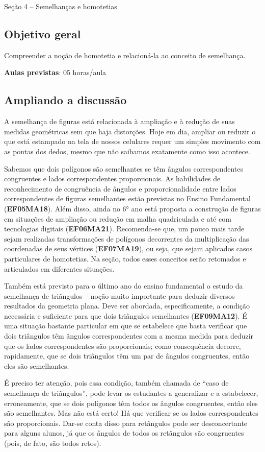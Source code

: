 \begin{paginatexto}{Seção 4 -- Semelhanças e homotetias}
\subsection{Objetivo geral}
Compreender a noção de homotetia e relacioná-la ao conceito de semelhança.

\textbf{Aulas previstas}: 05 horas/aula

\subsection{Ampliando a discussão}
A semelhança de figuras está relacionada à ampliação e à redução de suas medidas geométricas sem que haja distorções. Hoje em dia, ampliar ou reduzir o que está estampado na tela de nossos celulares requer um simples movimento com as pontas dos dedos, mesmo que não saibamos exatamente como isso acontece.

Sabemos que dois polígonos são semelhantes se têm ângulos correspondentes congruentes e lados correspondentes proporcionais. As habilidades de reconhecimento de congruência de ângulos e proporcionalidade entre lados correspondentes de figuras semelhantes estão previstas no Ensino Fundamental (\textbf{EF05MA18}). Além disso, ainda no 6° ano está proposta a construção de figuras em situações de ampliação ou redução em malha quadriculada e até com tecnologias digitais (\textbf{EF06MA21}). Recomenda-se que, um pouco mais tarde sejam realizadas transformações de polígonos decorrentes da multiplicação das coordenadas de seus vértices (\textbf{EF07MA19}), ou seja, que sejam aplicados casos particulares de homotetias. Na seção, todos esses conceitos serão retomados e articulados em diferentes situações. 

Também está previsto para o último ano do ensino fundamental o estudo da semelhança de triângulos -- noção muito importante para deduzir diversos resultados da geometria plana. Deve ser abordada, especificamente, a condição necessária e suficiente para que dois triângulos semelhantes (\textbf{EF09MA12}).  É uma situação bastante particular em que se estabelece que basta verificar que dois triângulos têm ângulos correspondentes com a mesma medida para deduzir que os lados correspondentes são proporcionais; como consequência decorre, rapidamente, que se dois triângulos têm um par de ângulos congruentes, então eles são semelhantes.

É preciso ter atenção, pois essa condição, também chamada de “caso de semelhança de triângulos”, pode levar os estudantes a generalizar e a estabelecer, erroneamente, que se dois polígonos têm todos os ângulos congruentes, então eles são semelhantes. Mas não está certo! Há que verificar se os lados correspondentes são proporcionais. Dar-se conta disso para retângulos pode ser desconcertante para alguns alunos, já que os ângulos de todos os retângulos são congruentes (pois, de fato, são todos retos).  


\end{paginatexto}
